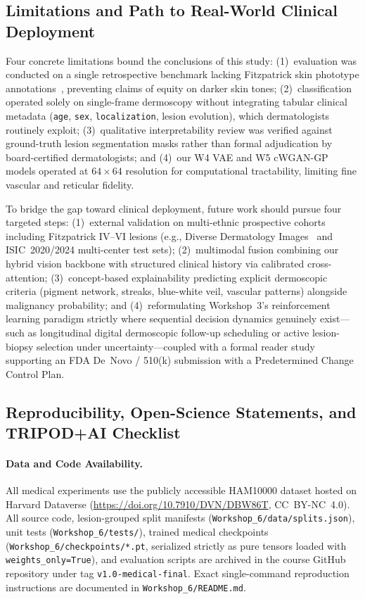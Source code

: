 \subsection{Limitations and Path to Real-World Clinical Deployment}
Four concrete limitations bound the conclusions of this study: (1)~evaluation was conducted on a single retrospective benchmark lacking Fitzpatrick skin phototype annotations~\cite{Daneshjou2022disparities}, preventing claims of equity on darker skin tones; (2)~classification operated solely on single-frame dermoscopy without integrating tabular clinical metadata (\texttt{age}, \texttt{sex}, \texttt{localization}, lesion evolution), which dermatologists routinely exploit; (3)~qualitative interpretability review was verified against ground-truth lesion segmentation masks rather than formal adjudication by board-certified dermatologists; and (4)~our W4 VAE and W5 cWGAN-GP models operated at $64\times 64$ resolution for computational tractability, limiting fine vascular and reticular fidelity.

To bridge the gap toward clinical deployment, future work should pursue four targeted steps: (1)~external validation on multi-ethnic prospective cohorts including Fitzpatrick IV--VI lesions (e.g., Diverse Dermatology Images~\cite{Daneshjou2022disparities} and ISIC~2020/2024 multi-center test sets); (2)~multimodal fusion combining our hybrid vision backbone with structured clinical history via calibrated cross-attention; (3)~concept-based explainability predicting explicit dermoscopic criteria (pigment network, streaks, blue-white veil, vascular patterns) alongside malignancy probability; and (4)~reformulating Workshop~3's reinforcement learning paradigm strictly where sequential decision dynamics genuinely exist—such as longitudinal digital dermoscopic follow-up scheduling or active lesion-biopsy selection under uncertainty—coupled with a formal reader study supporting an FDA De~Novo / 510(k) submission with a Predetermined Change Control Plan.

\subsection{Reproducibility, Open-Science Statements, and TRIPOD+AI Checklist}
\paragraph{Data and Code Availability.}
All medical experiments use the publicly accessible HAM10000 dataset hosted on Harvard Dataverse (\url{https://doi.org/10.7910/DVN/DBW86T}, CC~BY-NC~4.0). All source code, lesion-grouped split manifests (\texttt{Workshop\_6/data/splits.json}), unit tests (\texttt{Workshop\_6/tests/}), trained medical checkpoints (\texttt{Workshop\_6/checkpoints/*.pt}, serialized strictly as pure tensors loaded with \texttt{weights\_only=True}), and evaluation scripts are archived in the course GitHub repository under tag \texttt{v1.0-medical-final}. Exact single-command reproduction instructions are documented in \texttt{Workshop\_6/README.md}.


